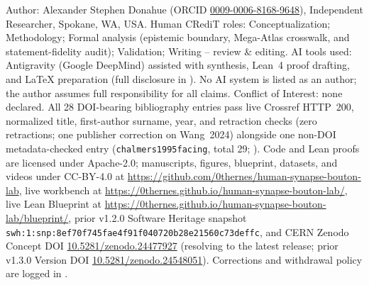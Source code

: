 \documentclass[11pt,letterpaper]{amsart}
\begin{document}
Author: Alexander Stephen Donahue (ORCID \href{https://orcid.org/0009-0006-8168-9648}{0009-0006-8168-9648}), Independent Researcher, Spokane, WA, USA. Human CRediT roles: Conceptualization; Methodology; Formal analysis (epistemic boundary, Mega-Atlas crosswalk, and statement-fidelity audit); Validation; Writing -- review \& editing. AI tools used: Antigravity (Google DeepMind) assisted with synthesis, Lean~4 proof drafting, and LaTeX preparation (full disclosure in ). No AI system is listed as an author; the author assumes full responsibility for all claims. Conflict of Interest: none declared. All 28 DOI-bearing bibliography entries pass live Crossref HTTP~200, normalized title, first-author surname, year, and retraction checks (zero retractions; one publisher correction on Wang~2024) alongside one non-DOI metadata-checked entry (\texttt{chalmers1995facing}, total 29; ). Code and Lean proofs are licensed under Apache-2.0; manuscripts, figures, blueprint, datasets, and videos under CC-BY-4.0 at \url{https://github.com/0thernes/human-synapse-bouton-lab}, live workbench at \url{https://0thernes.github.io/human-synapse-bouton-lab/}, live Lean Blueprint at \url{https://0thernes.github.io/human-synapse-bouton-lab/blueprint/}, prior v1.2.0 Software Heritage snapshot \nolinkurl{swh:1:snp:8ef70f745fae4f91f040720b28e21560c73deffc}, and CERN Zenodo Concept DOI \href{https://doi.org/10.5281/zenodo.24477927}{10.5281/zenodo.24477927} (resolving to the latest release; prior v1.3.0 Version DOI \href{https://doi.org/10.5281/zenodo.24548051}{10.5281/zenodo.24548051}). Corrections and withdrawal policy are logged in .



\end{document}
